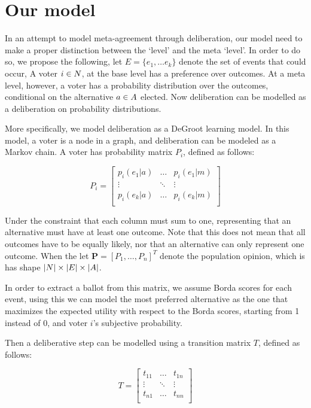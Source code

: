 \section{Our model}
\label{sec: main model}


In an attempt to model meta-agreement through deliberation, our model need to make a proper distinction between the `level' and the meta `level'. In order to do so, we propose the following, let \(E = \{e_{1}, \dots e_{k}\}\) denote the set of events that could occur, A voter $i \in N$, at the base level has a preference over outcomes. At a meta level, however, a voter has a probability distribution over the outcomes, conditional on the alternative \(a \in A\) elected. Now deliberation can be modelled as a deliberation on probability distributions.

More specifically, we model deliberation as a DeGroot learning model. In this model, a voter is a node in a graph, and deliberation can be modeled as a Markov chain. A voter has probability matrix $P_i$, defined as follows:

\[
	P_i =\begin{bmatrix}
		p_i(e_1 | a) & \dots  & p_i(e_1 | m) \\
		\vdots       & \ddots & \vdots       \\
		p_i(e_k | a) & \dots  & p_i(e_k | m) \\
	\end{bmatrix}
\]

Under the constraint that each column must sum to one, representing that an alternative must have at least one outcome. Note that this does not mean that all outcomes have to be equally likely, nor that an alternative can only represent one outcome. When the let $\boldsymbol{P}= [P_1, \dots, P_{n}]^{T}$ denote the population opinion, which is has shape \(|N| \times |E| \times |A|\).

In order to extract a ballot from this matrix, we assume Borda scores for each event, using this we can model the most preferred alternative as the one that maximizes the expected utility with respect to the Borda scores, starting from 1 instead of 0, and voter $i$'s subjective probability.

Then a deliberative step can be modelled using a transition matrix $T$, defined as follows:

\[
	T=\begin{bmatrix}
		t_{11} & \dots  & t_{1n} \\
		\vdots & \ddots & \vdots \\
		t_{n1} & \dots  & t_{nn} \\
	\end{bmatrix}
\]

